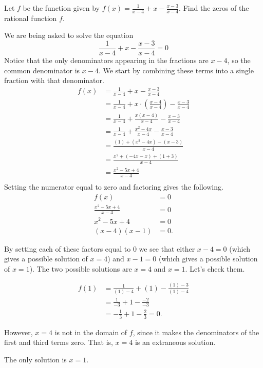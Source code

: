 \documentclass[nooutcomes]{ximera}
\begin{document}
	\begin{example}

		Let $f$ be the function given by $f(x) =  \frac{1}{x-4} + x -\frac{x-3}{x-4}$. Find the zeros of the rational function $f$.
	
		\begin{explanation} 

			We are being asked to solve the equation \[ \frac{1}{x-4} + x -\frac{x-3}{x-4} =0 \]
			Notice that the only denominators appearing in the fractions are $x-4$, so the common denominator is $x-4$. We start by combining 
			these terms into a single fraction with that denominator.
			\begin{align*}
				f(x) & =  \frac{1}{x-4} + x -\frac{x-3}{x-4} \\
					& =  \frac{1}{x-4} + x\cdot\left(\frac{x-4}{x-4}\right) -\frac{x-3}{x-4} \\
					& =  \frac{1}{x-4} + \frac{x(x-4)}{x-4} -\frac{x-3}{x-4} \\
					& =  \frac{1}{x-4} + \frac{x^2-4x}{x-4} -\frac{x-3}{x-4} \\
					& =  \frac{(1)+(x^2-4x)-(x-3)}{x-4}\\	
					& =  \frac{x^2 + (-4x-x) + (1+3)}{x-4}\\	
					& =  \frac{x^2 - 5x + 4}{x-4}\\	
			\end{align*}			
			Setting the numerator equal to zero and factoring gives the following.
			\begin{align*}
				f(x) & = 0 \\
				\frac{x^2 - 5x + 4}{x-4} &= 0\\	
				x^2-5x+4 &= 0\\
				(x-4)(x-1) &= 0.
			\end{align*}

			By setting each of these factors equal to $0$ we see that either $x-4=0$ (which gives a possible solution of $x=4$) and 
			$x-1=0$ (which gives a possible solution of $x=1$). The two possible solutions are $x=4$ and $x=1$. Let's check them.
			
			\begin{align*}
				f(1) &= \frac{1}{(1)-4} + (1) -\frac{(1)-3}{(1)-4}	\\
					&= \frac{1}{-3} + 1 - \frac{-2}{-3}\\
					&= -\frac{1}{3} + 1 - \frac{2}{3} = 0.
			\end{align*}
			
			However, $x=4$ is not in the domain of $f$, since it makes the denominators of the first and third terms zero. That is, $x=4$ 
			is an extraneous solution.
			
			The only solution is $x=1$.
		\end{explanation}
	\end{example}
	
\end{document}
